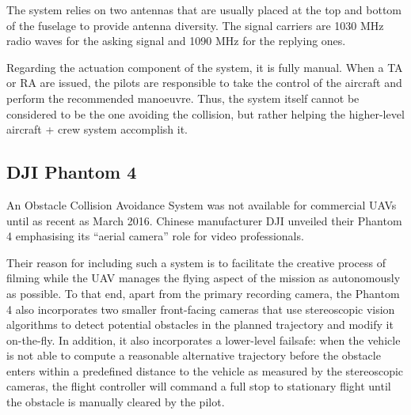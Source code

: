 The system relies on two antennas that are usually placed at the top and bottom of the fuselage to provide antenna diversity.
The signal carriers are 1030 MHz radio waves for the asking signal and 1090 MHz for the replying ones.

Regarding the actuation component of the system, it is fully manual.
When a TA or RA are issued, the pilots are responsible to take the control of the aircraft and perform the recommended manoeuvre.
Thus, the system itself cannot be considered to be the one avoiding the collision, but rather helping the higher-level aircraft + crew system accomplish it.

\subsection{DJI Phantom 4}

An Obstacle Collision Avoidance System was not available for commercial UAVs until as recent as March 2016.
Chinese manufacturer DJI unveiled their Phantom 4 emphasising its ``aerial camera'' role for video professionals.

Their reason for including such a system is to facilitate the creative process of filming while the UAV manages the flying aspect of the mission as autonomously as possible.
To that end, apart from the primary recording camera, the Phantom 4 also incorporates two smaller front-facing cameras that use stereoscopic vision algorithms to detect potential obstacles in the planned trajectory and modify it on-the-fly.
In addition, it also incorporates a lower-level failsafe: when the vehicle is not able to compute a reasonable alternative trajectory before the obstacle enters within a predefined distance to the vehicle as measured by the stereoscopic cameras, the flight controller will command a full stop to stationary flight until the obstacle is manually cleared by the pilot.





% 
% 


